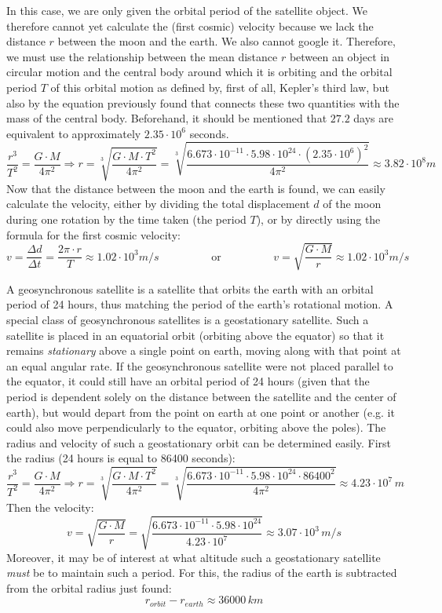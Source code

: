 In this case, we are only given the orbital period of the satellite object. We therefore cannot yet calculate the (first cosmic) velocity because we lack the distance $r$ between the moon and the earth. We also cannot google it. Therefore, we must use the relationship between the mean distance $r$ between an object in circular motion and the central body around which it is orbiting and the orbital period $T$ of this orbital motion as defined by, first of all, Kepler's third law, but also by the equation previously found that connects these two quantities with the mass of the central body. Beforehand, it should be mentioned that $27.2$ days are equivalent to approximately $2.35 \cdot 10^6$ seconds. $$\frac{r^3}{T^2} = \frac{G \cdot M}{4 \pi^2} \Rightarrow r = \sqrt[3]{\frac{G \cdot M \cdot T^2}{4 \pi^2}} = \sqrt[3]{\frac{6.673 \cdot 10^{-11} \cdot 5.98 \cdot 10^24 \cdot (2.35 \cdot 10^6)^2}{4 \pi^2}} \approx 3.82 \cdot 10^8 m$$ Now that the distance between the moon and the earth is found, we can easily calculate the velocity, either by dividing the total displacement $d$ of the moon during one rotation by the time taken (the period $T$), or by directly using the formula for the first cosmic velocity: $$v = \frac{\Delta d}{\Delta t} = \frac{2 \pi \cdot r}{T} \approx 1.02 \cdot 10^3 m/s \hspace{2cm} \text{or} \hspace{2cm} v = \sqrt{\frac{G \cdot M}{r}} \approx 1.02 \cdot 10^3 m/s$$


A geosynchronous satellite is a satellite that orbits the earth with an orbital period of 24 hours, thus matching the period of the earth's rotational motion. A special class of geosynchronous satellites is a geostationary satellite. Such a satellite is placed in an equatorial orbit (orbiting above the equator) so that it remains \emph{stationary} above a single point on earth, moving along with that point at an equal angular rate. If the geosynchronous satellite were not placed parallel to the equator, it could still have an orbital period of 24 hours (given that the period is dependent solely on the distance between the satellite and the center of earth), but would depart from the point on earth at one point or another (e.g. it could also move perpendicularly to the equator, orbiting above the poles). The radius and velocity of such a geostationary orbit can be determined easily. First the radius (24 hours is equal to 86400 seconds): $$\frac{r^3}{T^2} = \frac{G \cdot M}{4 \pi^2} \Rightarrow r = \sqrt[3]{\frac{G \cdot M \cdot T^2}{4 \pi^2}} = \sqrt[3]{\frac{6.673 \cdot 10^{-11} \cdot 5.98 \cdot 10^24 \cdot 86400^2}{4 \pi^2}} \approx 4.23 \cdot 10^7 \, m$$ Then the velocity: $$v = \sqrt{\frac{G \cdot M}{r}} = \sqrt{\frac{6.673 \cdot 10^{-11} \cdot 5.98 \cdot 10^24}{4.23 \cdot 10^7}} \approx 3.07 \cdot 10^3 \, m/s$$ Moreover, it may be of interest at what altitude such a geostationary satellite \emph{must} be to maintain such a period. For this, the radius of the earth is subtracted from the orbital radius just found: $$r_{orbit} - r_{earth} \approx 36000 \, km$$

